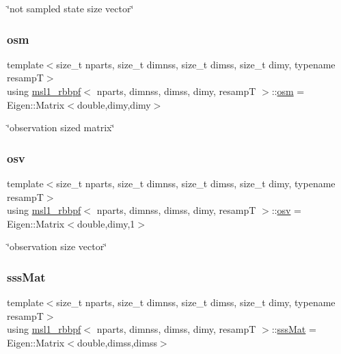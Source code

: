 \char`\"{}not sampled state size vector\char`\"{} \mbox{\label{classmsl1__rbbpf_a1282d71d4d1fc83fd5139ad51c549ecc}} 
\subsubsection{\texorpdfstring{osm}{osm}}
{\footnotesize\ttfamily template$<$size\+\_\+t nparts, size\+\_\+t dimnss, size\+\_\+t dimss, size\+\_\+t dimy, typename resampT$>$ \\
using \hyperlink{classmsl1__rbbpf}{msl1\+\_\+rbbpf}$<$ nparts, dimnss, dimss, dimy, resampT $>$\+::\hyperlink{classmsl1__rbbpf_a1282d71d4d1fc83fd5139ad51c549ecc}{osm} =  Eigen\+::\+Matrix$<$double,dimy,dimy$>$}

\char`\"{}observation sized matrix\char`\"{} \mbox{\label{classmsl1__rbbpf_a23daf10ba0f0b6fead88bc83b4fa27a3}} 
\subsubsection{\texorpdfstring{osv}{osv}}
{\footnotesize\ttfamily template$<$size\+\_\+t nparts, size\+\_\+t dimnss, size\+\_\+t dimss, size\+\_\+t dimy, typename resampT$>$ \\
using \hyperlink{classmsl1__rbbpf}{msl1\+\_\+rbbpf}$<$ nparts, dimnss, dimss, dimy, resampT $>$\+::\hyperlink{classmsl1__rbbpf_a23daf10ba0f0b6fead88bc83b4fa27a3}{osv} =  Eigen\+::\+Matrix$<$double,dimy,1$>$}

\char`\"{}observation size vector\char`\"{} \mbox{\label{classmsl1__rbbpf_a6b6f080289374270272071e2e3175cd5}} 
\subsubsection{\texorpdfstring{sss\+Mat}{sssMat}}
{\footnotesize\ttfamily template$<$size\+\_\+t nparts, size\+\_\+t dimnss, size\+\_\+t dimss, size\+\_\+t dimy, typename resampT$>$ \\
using \hyperlink{classmsl1__rbbpf}{msl1\+\_\+rbbpf}$<$ nparts, dimnss, dimss, dimy, resampT $>$\+::\hyperlink{classmsl1__rbbpf_a6b6f080289374270272071e2e3175cd5}{sss\+Mat} =  Eigen\+::\+Matrix$<$double,dimss,dimss$>$}

